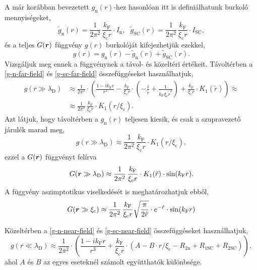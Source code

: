 \documentclass[a4paper,12pt,titlepage]{article}
\newcommand{\RR}{{\vb*{r}}}
\newcommand{\kF}{{k_\text{F}}}
\newcommand{\xic}{{\xi_\text{c}}}
\begin{document}
A már korábban bevezetett $g_\text{n}(r)$-hez hasonlóan itt is definiálhatunk burkoló mennyiségeket,
\begin{equation}
	\tilde{g}_\text{n}(r) = \frac{1}{2 \pi^2} \, \frac{\kF}{\xic r} \cdot I_\text{n}, ~~~
	\tilde{g}_\text{SC}(r) = \frac{1}{2 \pi^2} \, \frac{\kF}{\xic r} \cdot I_\text{SC},
\end{equation}
és a teljes $G(\RR)$ függvény $g(r)$ burkolóját kifejezhetjük ezekkel,
\begin{equation}
	g(r) = g_\text{n}(r) - \tilde{g}_\text{n}(r) + \tilde{g}_\text{SC}(r).
\end{equation}
Vizsgáljuk meg ennek a függvénynek a távol- és közeltéri értékeit.  Távoltérben a \eqref{g-n-far-field} és \eqref{g-sc-far-field} összefüggéseket használhatjuk,
\begin{equation}
\begin{split}
	g(r \gg \lambda_\text{D}) & \approx \frac{1}{2 \pi^2} \cdot \left( \frac{1 - i \kF r}{r^3} - \frac{\kF}{\xic r} \cdot \left( -\frac{i}{\tilde{r}} + \frac{1}{\kF \xic \tilde{r}^2} \right) + \frac{\kF}{\xic r} \cdot K_1(\tilde{r}) \right) \approx \\
	& \approx \frac{1}{2 \pi^2} \, \frac{\kF}{\xic r} \cdot K_1(r / \xic).
\end{split}
\end{equation}
Azt látjuk, hogy távoltérben a $g_\text{n}(r)$ teljesen kiesik, és csak a szupravezető járulék marad meg,
\begin{equation}
	g(r \gg \lambda_\text{D}) \approx \frac{1}{2 \pi^2} \, \frac{\kF}{\xic r} \cdot K_1(r / \xic),
\end{equation}
ezzel a $G(\RR)$ függvényt felírva
\begin{equation}
	G(\RR \gg \lambda_\text{D}) \approx \frac{1}{2 \pi^2} \, \frac{\kF}{\xic r} \cdot K_1(\tilde{r}) \cdot \sin(\kF r).
\end{equation}
A függvény aszimptotikus viselkedését is meghatározhatjuk ebből,
\begin{equation}
	G(\RR \gg \xic) \approx \frac{1}{2 \pi^2} \, \frac{\kF}{\xic r} \sqrt{\frac{\pi}{2 \tilde{r}}} \cdot e^{-\tilde{r}} \cdot \sin(\kF r)
\end{equation}

Közeltérben a \eqref{g-n-near-field} és \eqref{g-sc-near-field} összefüggéseket használhatjuk,
\begin{equation} \label{g-near-field}
	g(r \ll \lambda_\text{D}) \approx \frac{1}{2 \pi^2} \cdot \left( \frac{1 - i \kF r}{r^3} + \frac{\kF}{\xic r} \cdot \left( A - B \cdot r / \xic - R_{2 \text{n}} + R_{1 \text{SC}} + R_{2 \text{SC}} \right) \right),
\end{equation}
ahol $A$ és $B$ az egyes eseteknél számolt együtthatók különbsége.
\end{document}
